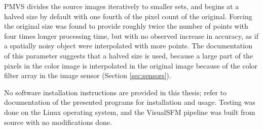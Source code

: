 PMVS divides the source images iteratively to smaller sets, and begins at a halved size by default with one fourth of the pixel count of the original.
Forcing the original size was found to provide roughly twice the number of points with four times longer processing time, but with no observed increase in accuracy, as if a spatially noisy object were interpolated with more points.
The documentation of this parameter suggests that a halved size is used, because a large part of the pixels in the color image is interpolated in the original image because of the color filter array in the image sensor (Section \ref{sec:sensors}).

No software installation instructions are provided in this thesis; refer to documentation of the presented programs for installation and usage.
Testing was done on the Linux operating system, and the VisualSFM pipeline was built from source with no modifications done.

